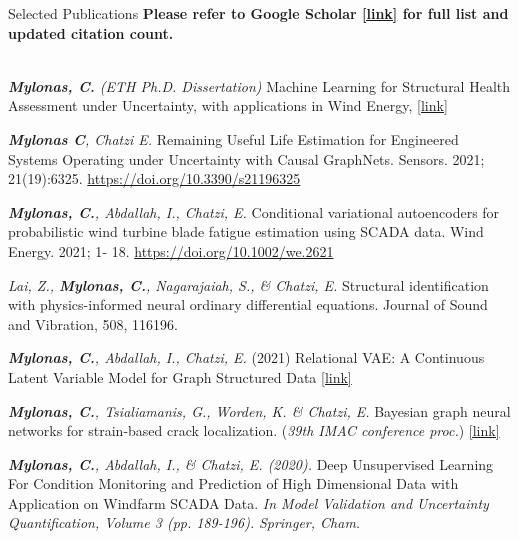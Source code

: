 \documentclass{resume} %
\begin{document}
\begin{rSection}{Selected Publications}
  \newcommand{\myvspace}{\vspace{-3pt}}
\def\arraystretch{1.0}
\textbf{Please refer to  Google Scholar \href{https://scholar.google.com/citations?user=W7giwJEAAAAJ}{[link]} for full list and updated citation count.} \\ \\
  \small{
    \textit{\textbf{Mylonas, C.} (ETH Ph.D. Dissertation)} Machine Learning for Structural Health Assessment under Uncertainty, with applications in Wind Energy, \href{https://www.research-collection.ethz.ch/handle/20.500.11850/511551}{[link]}

    \textit{\textbf{Mylonas C}, Chatzi E.} Remaining Useful Life Estimation for Engineered Systems Operating under Uncertainty with Causal GraphNets. Sensors. 2021; 21(19):6325. \href{https://doi.org/10.3390/s21196325}{https://doi.org/10.3390/s21196325}

    \textit{\textbf{Mylonas, C.}, Abdallah, I., Chatzi, E.} Conditional variational autoencoders for probabilistic wind turbine blade fatigue estimation using SCADA data. Wind Energy. 2021; 1‐ 18. \href{https://doi.org/10.1002/we.2621}{https://doi.org/10.1002/we.2621}

 \textit{Lai, Z., \textbf{Mylonas, C.}, Nagarajaiah, S., \& Chatzi, E.} Structural identification with physics-informed neural ordinary differential equations. Journal of Sound and Vibration, 508, 116196. 

    \textit{\textbf{Mylonas, C.}, Abdallah, I., Chatzi, E.} (2021) Relational VAE: A Continuous Latent Variable Model for 
    Graph Structured Data \href{https://arxiv.org/abs/2106.16049}{[link]}

\textit{\textbf{Mylonas, C.}, Tsialiamanis, G., Worden, K. \& Chatzi, E. } Bayesian graph neural networks for 
strain-based crack localization.  (\textit{39th IMAC conference proc.}) \href{https://arxiv.org/abs/2012.06791}{[link]}

\textit{\textbf{Mylonas, C.}, Abdallah, I., \& Chatzi, E. (2020).} Deep Unsupervised Learning For Condition
Monitoring and Prediction of High Dimensional Data with Application on Windfarm SCADA Data. \textit{In Model Validation and Uncertainty Quantification, Volume 3 (pp. 189-196).} \textit{Springer, Cham.}
}

\end{rSection}
\end{document}
